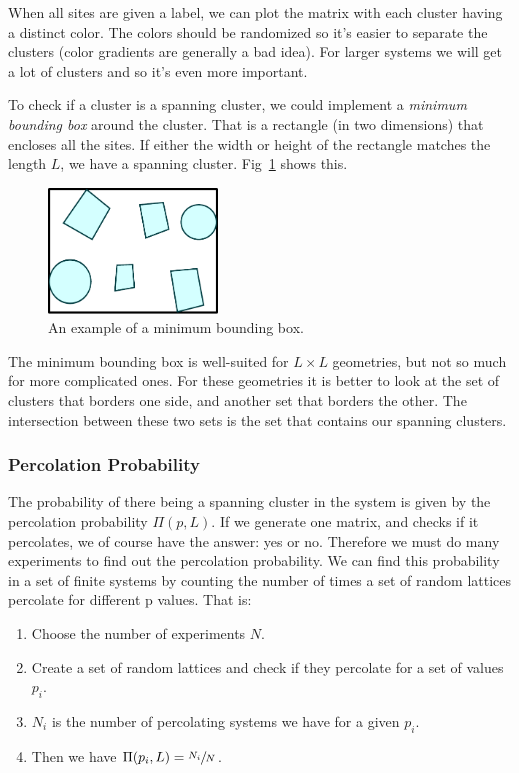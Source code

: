 \documentclass[11pt]{article}
\numberwithin{equation}{section}
\numberwithin{figure}{section}
\newcommand{\ita}[1]{\textit{#1}}
\begin{document}
When all sites are given a label, we can plot the matrix
with each cluster having a distinct color. The colors should
be randomized so it's easier to separate the clusters (color
gradients are generally a bad idea).
For larger systems we will get a lot of clusters and so
it's even more important.

To check if a cluster is a spanning cluster,
we could implement a \ita{minimum bounding box}
around the cluster. That is a rectangle (in two dimensions)
that encloses all the sites. If either the width or height
of the rectangle matches the length $L$, we have a spanning cluster.
Fig~\ref{fig:min-bound-box} shows this.

\begin{figure}[h]
    \centering
    \includegraphics[width=0.40\textwidth]{figures/percolation-figures/minimum-bounding-rectangle.pdf}    
    \caption{An example of a minimum bounding box.}\label{fig:min-bound-box}
\end{figure}

The minimum bounding box is well-suited for $L\times L$ geometries,
but not so much for more complicated ones.
For these geometries it is better to look at the set of clusters
that borders one side, and another set that borders the other.
The intersection between these two sets is the set that contains
our spanning clusters.

\subsubsection{Percolation Probability}

The probability of there being a spanning cluster in the
system is given by the percolation probability $\Pi (p, L)$.
If we generate one matrix, and checks if it percolates, 
we of course have the answer: yes or no.
Therefore we must do many experiments to find out
the percolation probability.
We can find this probability in a set of finite systems
by counting the number of times a set of random lattices
percolate for different p values. That is:

\begin{enumerate}
    \item Choose the number of experiments $N$.
    \item Create a set of random lattices 
        and check if they percolate for
        a set of values $p_i$.
    \item $N_i$ is the number of percolating systems we have for
        a given $p_i$.
    \item Then we have $\Pi(p_i, L) = \sfrac{N_i}{N}$.
\end{enumerate}
\end{document}
